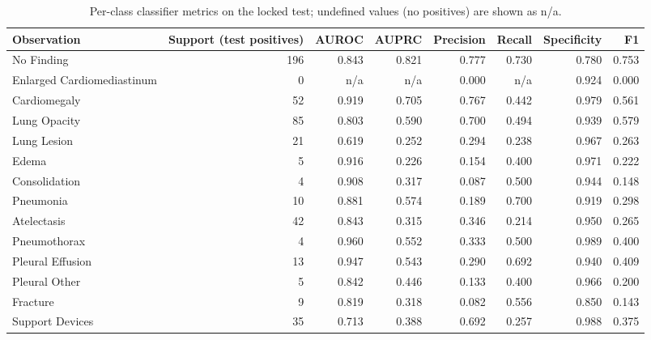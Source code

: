 \begin{table}[t]
\centering
\scriptsize
\begin{tabular}{lrrrrrrr}
\hline
Observation & Support (test positives) & AUROC & AUPRC & Precision & Recall & Specificity & F1 \\
\hline
No Finding & 196 & 0.843 & 0.821 & 0.777 & 0.730 & 0.780 & 0.753 \\
Enlarged Cardiomediastinum & 0 & n/a & n/a & 0.000 & n/a & 0.924 & 0.000 \\
Cardiomegaly & 52 & 0.919 & 0.705 & 0.767 & 0.442 & 0.979 & 0.561 \\
Lung Opacity & 85 & 0.803 & 0.590 & 0.700 & 0.494 & 0.939 & 0.579 \\
Lung Lesion & 21 & 0.619 & 0.252 & 0.294 & 0.238 & 0.967 & 0.263 \\
Edema & 5 & 0.916 & 0.226 & 0.154 & 0.400 & 0.971 & 0.222 \\
Consolidation & 4 & 0.908 & 0.317 & 0.087 & 0.500 & 0.944 & 0.148 \\
Pneumonia & 10 & 0.881 & 0.574 & 0.189 & 0.700 & 0.919 & 0.298 \\
Atelectasis & 42 & 0.843 & 0.315 & 0.346 & 0.214 & 0.950 & 0.265 \\
Pneumothorax & 4 & 0.960 & 0.552 & 0.333 & 0.500 & 0.989 & 0.400 \\
Pleural Effusion & 13 & 0.947 & 0.543 & 0.290 & 0.692 & 0.940 & 0.409 \\
Pleural Other & 5 & 0.842 & 0.446 & 0.133 & 0.400 & 0.966 & 0.200 \\
Fracture & 9 & 0.819 & 0.318 & 0.082 & 0.556 & 0.850 & 0.143 \\
Support Devices & 35 & 0.713 & 0.388 & 0.692 & 0.257 & 0.988 & 0.375 \\
\hline
\end{tabular}
\caption{Per-class classifier metrics on the locked test; undefined values (no positives) are shown as n/a.}
\label{tab:table3_per_class_classifier_metrics}
\end{table}
